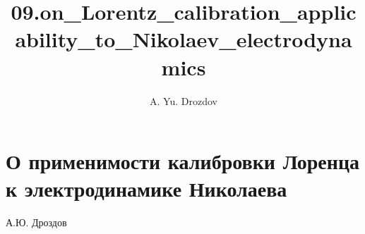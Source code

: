 \documentclass[11pt]{article}
\author{A. Yu. Drozdov}
\title{09.on\_Lorentz\_calibration\_applicability\_to\_Nikolaev\_electrodynamics}
\begin{document}
    
    \maketitle
    
    

    
    \section{О применимости калибровки Лоренца к электродинамике
Николаева}\label{ux43e-ux43fux440ux438ux43cux435ux43dux438ux43cux43eux441ux442ux438-ux43aux430ux43bux438ux431ux440ux43eux432ux43aux438-ux43bux43eux440ux435ux43dux446ux430-ux43a-ux44dux43bux435ux43aux442ux440ux43eux434ux438ux43dux430ux43cux438ux43aux435-ux43dux438ux43aux43eux43bux430ux435ux432ux430}

А.Ю. Дроздов
\end{document}
